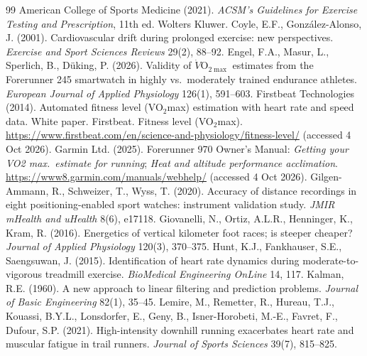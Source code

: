 \documentclass[11pt,a4paper]{article}
\begin{document}
\begin{thebibliography}{99}\small
{} American College of Sports Medicine (2021). \emph{ACSM's Guidelines for Exercise Testing and Prescription}, 11th ed. Wolters Kluwer.
 Coyle, E.F., Gonz\'alez-Alonso, J. (2001). Cardiovascular drift during prolonged exercise: new perspectives. \emph{Exercise and Sport Sciences Reviews} 29(2), 88--92.
 Engel, F.A., Masur, L., Sperlich, B., D\"uking, P. (2026). Validity of $\dot V$O$_{2\max}$ estimates from the Forerunner 245 smartwatch in highly vs.\ moderately trained endurance athletes. \emph{European Journal of Applied Physiology} 126(1), 591--603.
 Firstbeat Technologies (2014). Automated fitness level (VO$_2$max) estimation with heart rate and speed data. White paper.
 Firstbeat. Fitness level (VO$_2$max). \url{https://www.firstbeat.com/en/science-and-physiology/fitness-level/} (accessed 4 Oct 2026).
 Garmin Ltd. (2025). Forerunner 970 Owner's Manual: \emph{Getting your VO2 max.\ estimate for running}; \emph{Heat and altitude performance acclimation}. \url{https://www8.garmin.com/manuals/webhelp/} (accessed 4 Oct 2026).
 Gilgen-Ammann, R., Schweizer, T., Wyss, T. (2020). Accuracy of distance recordings in eight positioning-enabled sport watches: instrument validation study. \emph{JMIR mHealth and uHealth} 8(6), e17118.
 Giovanelli, N., Ortiz, A.L.R., Henninger, K., Kram, R. (2016). Energetics of vertical kilometer foot races; is steeper cheaper? \emph{Journal of Applied Physiology} 120(3), 370--375.
 Hunt, K.J., Fankhauser, S.E., Saengsuwan, J. (2015). Identification of heart rate dynamics during moderate-to-vigorous treadmill exercise. \emph{BioMedical Engineering OnLine} 14, 117.
 Kalman, R.E. (1960). A new approach to linear filtering and prediction problems. \emph{Journal of Basic Engineering} 82(1), 35--45.
 Lemire, M., Remetter, R., Hureau, T.J., Kouassi, B.Y.L., Lonsdorfer, E., Geny, B., Isner-Horobeti, M.-E., Favret, F., Dufour, S.P. (2021). High-intensity downhill running exacerbates heart rate and muscular fatigue in trail runners. \emph{Journal of Sports Sciences} 39(7), 815--825.

\end{thebibliography}
\end{document}
